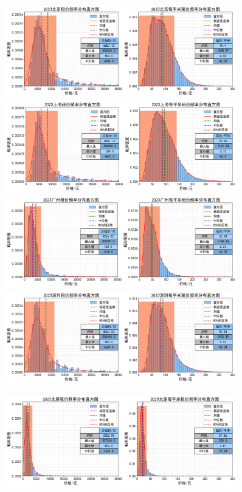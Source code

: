 \documentclass[lang=cn,11pt,a4paper]{elegantpaper}
\begin{document}
\begin{figure}[H]
    \centering
    \includegraphics[width=0.9\textwidth]{image/2023北京租金分布.png}
    \includegraphics[width=0.9\textwidth]{image/2023上海租金分布.png}
    \includegraphics[width=0.9\textwidth]{image/2023广州租金分布.png}
    \includegraphics[width=0.9\textwidth]{image/2023深圳租金分布.png}
\end{figure}

\begin{figure}[H]
    \centering
    \includegraphics[width=0.9\textwidth]{image/2023太原租金分布.png}
\end{figure}
\end{document}
